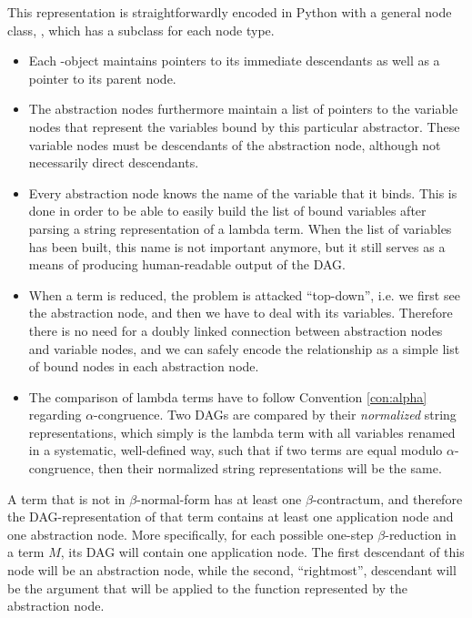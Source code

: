 This representation is straightforwardly encoded in Python with a general node
class, , which has a subclass for each node type.
\begin{itemize}
	\item Each -object maintains pointers to its immediate 
	descendants as well as a pointer to its parent node.
	
	\item The abstraction nodes furthermore maintain a list of pointers to the
	variable nodes that represent the variables bound by this particular abstractor.
	These variable nodes must be descendants of the abstraction node, although 
	not necessarily direct descendants.
	
	\item Every abstraction node knows the name of the variable that it binds.
	This is done in order to be able to easily build the list of bound 
	variables after parsing a string representation of a lambda term. When
	the list of variables has been built, this name is not important anymore, 
	but it still serves as a means of producing human-readable output of the DAG.
	
	\item When a term is reduced, the problem is attacked ``top-down'', i.e. we first
	see the abstraction node, and then we have to deal with its variables.
	Therefore there is no need for a doubly linked connection between abstraction
	nodes and variable nodes, and we can safely encode the relationship as a simple
	list of bound nodes in each abstraction node.
	
	\item The comparison of lambda terms have to follow Convention \ref{con:alpha} regarding
	$\alpha$-congruence. Two DAGs are compared by their \emph{normalized} string representations,
	which simply is the lambda term with all
	variables renamed in a systematic, well-defined way, such that if two terms
	are equal modulo $\alpha$-congruence, then their normalized string representations will
	be the same.
\end{itemize}

A term that is not in $\beta$-normal-form has at least one $\beta$-contractum,
and therefore the DAG-re\-pre\-sen\-ta\-tion of that term contains at least one
application node and one abstraction node. More specifically, for each
possible one-step $\beta$-reduction in a term $M$, its DAG will contain one
application node. The first descendant of this node will be an abstraction
node, while the second, ``rightmost'', descendant will be the argument that
will be applied to the function represented by the abstraction node.

